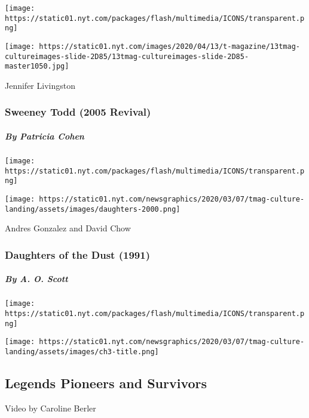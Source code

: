 \texttt{[image: https://static01.nyt.com/packages/flash/multimedia/ICONS/transparent.png]}

\texttt{[image: https://static01.nyt.com/images/2020/04/13/t-magazine/13tmag-cultureimages-slide-2D85/13tmag-cultureimages-slide-2D85-master1050.jpg]}

Jennifer Livingston

\hypertarget{sweeney-todd-2005-revival}{%
\subsubsection{Sweeney Todd (2005
Revival)}\label{sweeney-todd-2005-revival}}

\hypertarget{by-patricia-cohen}{%
\subparagraph{By Patricia Cohen}\label{by-patricia-cohen}}

\href{https://www.nytimes.com/interactive/2020/04/13/t-magazine/daughters-of-the-dust.html}{}

\texttt{[image: https://static01.nyt.com/packages/flash/multimedia/ICONS/transparent.png]}

\texttt{[image: https://static01.nyt.com/newsgraphics/2020/03/07/tmag-culture-landing/assets/images/daughters-2000.png]}

Andres Gonzalez and David Chow

\hypertarget{daughters-of-the-dust-1991}{%
\subsubsection{Daughters of the Dust
(1991)}\label{daughters-of-the-dust-1991}}

\hypertarget{by-a-o-scott-1}{%
\subparagraph{By A. O. Scott}\label{by-a-o-scott-1}}

\texttt{[image: https://static01.nyt.com/packages/flash/multimedia/ICONS/transparent.png]}

\texttt{[image: https://static01.nyt.com/newsgraphics/2020/03/07/tmag-culture-landing/assets/images/ch3-title.png]}

\hypertarget{legends-pioneers-and-survivors}{%
\subsection{Legends Pioneers and
Survivors}\label{legends-pioneers-and-survivors}}

\href{https://www.nytimes.com/interactive/2020/04/13/t-magazine/butch-stud-lesbian.html}{}

Video by Caroline Berler

